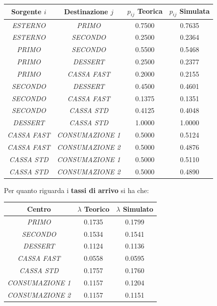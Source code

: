 \documentclass{article}
\begin{document}
\begin{center}
\begin{tabular}{|c|c|c|c|}
 \hline
 \textbf{Sorgente $i$} & \textbf{Destinazione $j$} & \textbf{\(p_{ij}\) Teorica} & \textbf{\(p_{ij}\) Simulata}\\
 \hline
 \textit{ESTERNO} & \textit{PRIMO}   & 0.7500 & 0.7635\\
 \hline
 \textit{ESTERNO} & \textit{SECONDO}   & 0.2500 & 0.2364\\
 \hline
 \textit{PRIMO} & \textit{SECONDO}   & 0.5500 & 0.5468\\
 \hline
 \textit{PRIMO} & \textit{DESSERT}   & 0.2500 & 0.2377\\
 \hline
 \textit{PRIMO} & \textit{CASSA FAST}   & 0.2000 & 0.2155\\
\hline
 \textit{SECONDO} & \textit{DESSERT}   & 0.4500 & 0.4601\\
 \hline
 \textit{SECONDO} & \textit{CASSA FAST}   & 0.1375 & 0.1351\\
\hline
 \textit{SECONDO} & \textit{CASSA STD}   & 0.4125 & 0.4048\\
\hline
 \textit{DESSERT} & \textit{CASSA STD}   & 1.0000 & 1.0000\\
 \hline
 \textit{CASSA FAST} & \textit{CONSUMAZIONE 1}   & 0.5000 & 0.5124\\
 \hline
 \textit{CASSA FAST} & \textit{CONSUMAZIONE 2}   & 0.5000 & 0.4876\\
 \hline
 \textit{CASSA STD} & \textit{CONSUMAZIONE 1}   & 0.5000 & 0.5110\\
 \hline
 \textit{CASSA STD} & \textit{CONSUMAZIONE 2}   & 0.5000 & 0.4890\\
 \hline
\end{tabular}
\end{center}
Per quanto riguarda i \textbf{tassi di arrivo} si ha che:
\begin{center}
\begin{tabular}{|c|c|c|}
 \hline
 \textbf{Centro} & $\lambda$ \textbf{Teorico} & $\lambda$ \textbf{Simulato}\\
 \hline
 \textit{PRIMO} & 0.1735 & 0.1799\\
 \hline
 \textit{SECONDO} & 0.1534 & 0.1541\\
 \hline
 \textit{DESSERT} & 0.1124 & 0.1136\\
 \hline
 \textit{CASSA FAST} & 0.0558 & 0.0595\\
 \hline
 \textit{CASSA STD} & 0.1757 & 0.1760\\
 \hline
 \textit{CONSUMAZIONE 1} & 0.1157 & 0.1204\\
 \hline
 \textit{CONSUMAZIONE 2} & 0.1157 & 0.1151\\
 \hline
\end{tabular}
\end{center}
\end{document}
